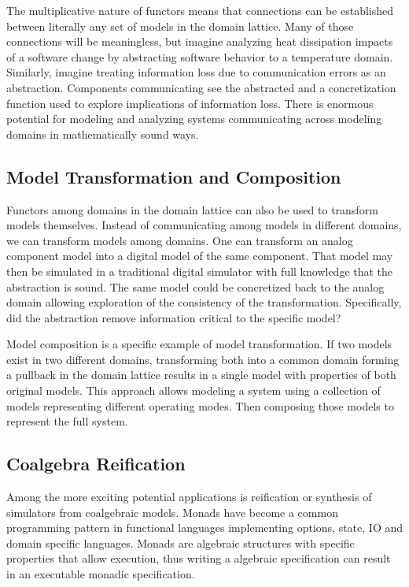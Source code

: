 \documentclass[12pt]{article}
\begin{document}
The multiplicative nature of functors means that connections can be
established between literally any set of models in the domain
lattice.  Many of those connections will be meaningless, but imagine
analyzing heat dissipation impacts of a software change by abstracting
software behavior to a temperature domain.  Similarly, imagine
treating information loss due to communication errors as an
abstraction.  Components communicating see the abstracted and a
concretization function used to explore implications of information
loss.  There is enormous potential for modeling and analyzing systems
communicating across modeling domains in mathematically sound ways.

\subsection{Model Transformation and Composition}

Functors among domains in the domain lattice can also be used to
transform models themselves.  Instead of communicating among models in
different domains, we can transform models among domains.  One can
transform an analog component model into a digital model of the same
component.  That model may then be simulated in a traditional digital
simulator with full knowledge that the abstraction is sound.  The same
model could be concretized back to the analog domain allowing
exploration of the consistency of the transformation.  Specifically,
did the abstraction remove information critical to the specific model?

Model composition is a specific example of model transformation.  If
two models exist in two different domains, transforming both into a
common domain forming a pullback in the domain lattice results in a
single model with properties of both original models.  This approach
allows modeling a system using a collection of models representing
different operating modes.  Then composing those models to represent
the full system.

\subsection{Coalgebra Reification}

Among the more exciting potential applications is reification or
synthesis of simulators from coalgebraic models.  Monads have become a
common programming pattern in functional languages implementing
options, state, IO and domain specific languages.  Monads are
algebraic structures with specific properties that allow execution,
thus writing a algebraic specification can result in an executable
monadic specification.
\end{document}
